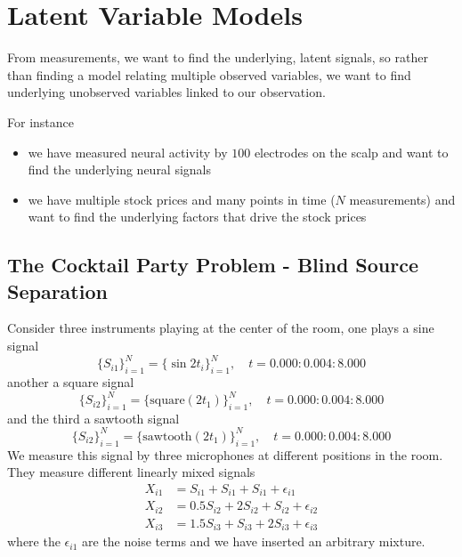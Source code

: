 \section{Latent Variable Models}
\thispagestyle{plain}

From measurements, we want to find the underlying, latent signals, so rather
than finding a model relating multiple observed variables, we want to find
underlying unobserved variables linked to our observation.

For instance
\begin{itemize}
    \item we have measured neural activity by $100$ electrodes on the scalp and want to find the underlying neural signals
    \item we have multiple stock prices and many points in time ($N$ measurements) and want to find the underlying factors that drive the stock prices
\end{itemize}

\subsection{The Cocktail Party Problem - Blind Source Separation}
Consider three instruments playing at the center of the room, one plays a sine signal
\begin{equation}
    \{S_{i1}\}_{i=1}^N = \{ \sin 2t_i \}_{i=1}^N, \quad t = 0.000:0.004:8.000
\end{equation}
another a square signal
\begin{equation}
    \{S_{i2}\}_{i=1}^N = \{ \text{square}(2t_1) \}_{i=1}^N, \quad t = 0.000:0.004:8.000
\end{equation}
and the third a sawtooth signal
\begin{equation}
    \{S_{i2}\}_{i=1}^N = \{ \text{sawtooth}(2t_1) \}_{i=1}^N, \quad t = 0.000:0.004:8.000
\end{equation}
We measure this signal by three microphones at different positions in the room. They measure different
linearly mixed signals
\begin{equation}
    \begin{aligned}
        X_{i1} &= S_{i1} + S_{i1} + S_{i1} + \epsilon_{i1} \\
        X_{i2} &= 0.5 S_{i2} + 2 S_{i2} + S_{i2} + \epsilon_{i2} \\
        X_{i3} &= 1.5 S_{i3} + S_{i3} + 2 S_{i3} + \epsilon_{i3}
    \end{aligned}
\end{equation}
where the $\epsilon_{i1}$ are the noise terms and we have inserted an arbitrary mixture.

